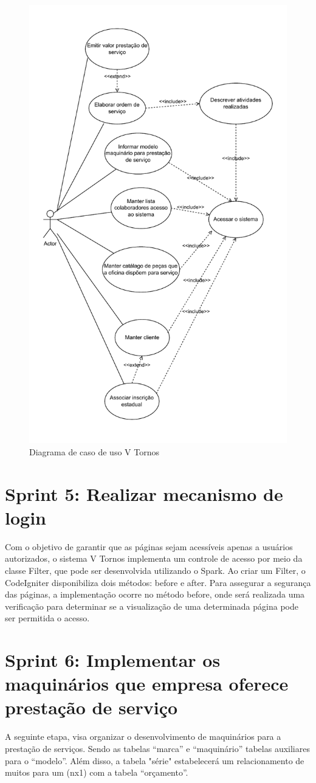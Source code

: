 \begin{figure}[h!]
    \centering
    \includegraphics[width=0.50\linewidth]{figs/TCC_Caso_de_Uso.pdf}
    \caption{Diagrama de caso de uso V Tornos}
    \label{fig:caso_uso}
\end{figure}

\section{Sprint 5: Realizar mecanismo de login}
\label{sec:Sprint_login}

Com o objetivo de garantir que as páginas sejam acessíveis apenas a usuários autorizados, o sistema V Tornos implementa um controle de acesso por meio da classe Filter, que pode ser desenvolvida utilizando o Spark. Ao criar um Filter, o CodeIgniter disponibiliza dois métodos: before e after. Para assegurar a segurança das páginas, a implementação ocorre no método before, onde será realizada uma verificação para determinar se a visualização de uma determinada página pode ser permitida o acesso.

\section{Sprint 6: Implementar os maquinários que empresa oferece prestação de serviço}
\label{label:maquinarios}

A seguinte etapa, visa organizar o desenvolvimento de maquinários para a prestação de serviços. Sendo as tabelas ``marca'' e ``maquinário'' tabelas auxiliares para o ``modelo''. Além disso, a tabela "série" estabelecerá um relacionamento de muitos para um (nx1) com a tabela ``orçamento''.

